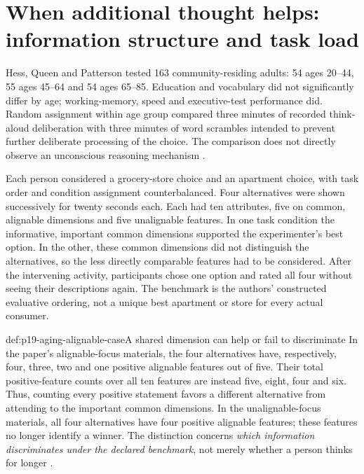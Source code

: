 \section{When additional thought helps: information structure and task load}
\label{sec:p19-aging-task-structure}

Hess, Queen and Patterson tested 163 community-residing adults: 54 ages
20--44, 55 ages 45--64 and 54 ages 65--85. Education and vocabulary did
not significantly differ by age; working-memory, speed and executive-test
performance did. Random assignment within age group compared three
minutes of recorded think-aloud deliberation with three minutes of word
scrambles intended to prevent further deliberate processing of the choice.
The comparison does not directly observe an unconscious reasoning
mechanism \cite[Method]{HessQueenPatterson2012Deliberation}.

Each person considered a grocery-store choice and an apartment choice,
with task order and condition assignment counterbalanced. Four alternatives
were shown successively for twenty seconds each. Each had ten attributes,
five on common, alignable dimensions and five unalignable features. In
one task condition the informative, important common dimensions supported
the experimenter's best option. In the other, these common dimensions did
not distinguish the alternatives, so the less directly comparable features
had to be considered. After the intervening activity, participants chose
one option and rated all four without seeing their descriptions again.
The benchmark is the authors' constructed evaluative ordering, not a
unique best apartment or store for every actual consumer.

\begin{hbexample}{def:p19-aging-alignable-case}{A shared dimension can help or fail to discriminate}
In the paper's alignable-focus materials, the four alternatives have,
respectively, four, three, two and one positive alignable features out
of five. Their total positive-feature counts over all ten features are
instead five, eight, four and six. Thus, counting every positive statement
favors a different alternative from attending to the important common
dimensions. In the unalignable-focus materials, all four alternatives
have four positive alignable features; these features no longer identify
a winner. The distinction concerns \emph{which information discriminates
under the declared benchmark}, not merely whether a person thinks for
longer \cite[table~2]{HessQueenPatterson2012Deliberation}.
\end{hbexample}

